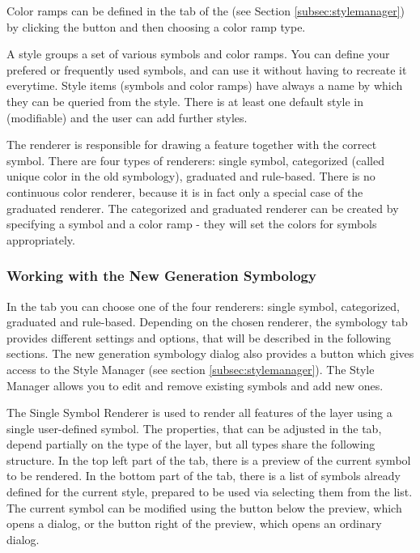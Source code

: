 Color ramps can be defined in the  tab of the  
(see Section \ref{subsec:stylemanager}) by clicking the  button and then choosing a color ramp type.


A style groups a set of various symbols and color ramps. You can define your
prefered or frequently used symbols, and can use it  without having to recreate
it everytime. Style items (symbols and color ramps) have always a name by which
they can be queried from the style. There is at least one default style in \qg 
(modifiable) and the user can add further styles.


The renderer is responsible for drawing a feature together with the correct
symbol. There are four types of renderers: single symbol, categorized (called
unique color in the old symbology), graduated and rule-based. There is no continuous 
color renderer, because it is in fact only a special case of the graduated renderer.
The categorized and graduated renderer can be created by specifying a symbol
and a color ramp - they will set the colors for symbols appropriately.

\subsubsection{Working with the New Generation Symbology}\label{new_generation_sym}

In the  tab you can choose one of the four renderers: single symbol, 
categorized, graduated and rule-based. Depending on the chosen renderer, the 
symbology tab provides different settings and options, that will be described 
in the following sections. The new generation symbology dialog also provides 
a  button which gives access to the Style Manager 
(see section \ref{subsec:stylemanager}). The Style Manager allows you to 
edit and remove existing symbols and add new ones. 


The Single Symbol Renderer is used to render all features of the layer using a
single user-defined symbol. The properties, that can be adjusted in the
 tab, depend partially on the type of the layer, but all types share
the following structure. In the top left part of the tab, there is a preview of
the current symbol to be rendered. In the bottom part of the tab, there is a
list of symbols already defined for the current style, prepared to be used via
selecting them from the list. The current symbol can be modified using the
 button below the preview, which opens a  
dialog, or the  button right of the preview, which opens an ordinary 
 dialog. 

